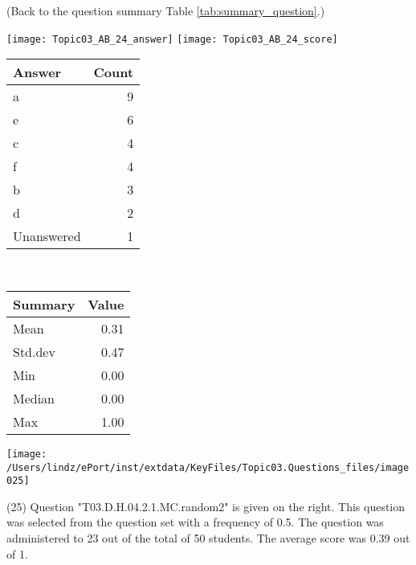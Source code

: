 \documentclass[12pt,english,nohyper]{tufte-handout}\usepackage[]{graphicx}\usepackage[]{color}
\begin{document}
 (Back to the question summary Table \ref{tab:summary_question}.)

\begin{center} \texttt{[image: Topic03\_AB\_24\_answer]} \texttt{[image: Topic03\_AB\_24\_score]} \end{center} 

\begin{center}%
\begin{tabular}{lr}
  \hline
Answer & Count \\ 
  \hline
a &   9 \\ 
  e &   6 \\ 
  c &   4 \\ 
  f &   4 \\ 
  b &   3 \\ 
  d &   2 \\ 
  Unanswered &   1 \\ 
   \hline
\end{tabular}
~~~~~~~~%
\begin{tabular}{lr}
  \hline
Summary & Value \\ 
  \hline
Mean & 0.31 \\ 
  Std.dev & 0.47 \\ 
  Min & 0.00 \\ 
  Median & 0.00 \\ 
  Max & 1.00 \\ 
   \hline
\end{tabular}
\end{center}\newpage{}



\vspace{4cm}\begin{marginfigure}\texttt{[image: /Users/lindz/ePort/inst/extdata/KeyFiles/Topic03.Questions\_files/image025]}\end{marginfigure}\vspace{-4cm} (25) Question "T03.D.H.04.2.1.MC.random2" is given on the right. This question was selected from the question set with a frequency of 0.5. The question was administered to 23 out of the total of 50 students. The average score was 0.39 out of 1.
\end{document}

